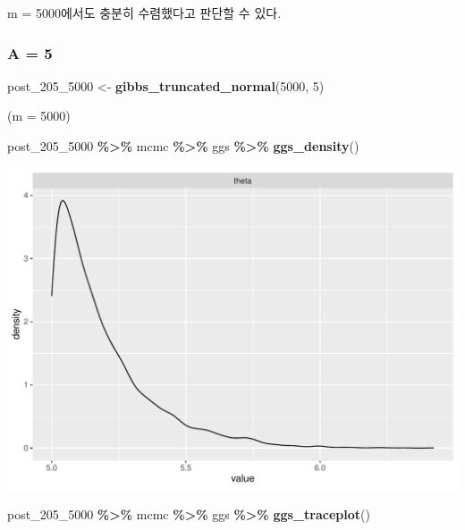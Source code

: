 \documentclass[
]{article}
\newenvironment{Shaded}{\begin{snugshade}}{\end{snugshade}}
\newcommand{\DecValTok}[1]{\textcolor[rgb]{0.00,0.00,0.81}{#1}}
\newcommand{\FunctionTok}[1]{\textcolor[rgb]{0.13,0.29,0.53}{\textbf{#1}}}
\newcommand{\NormalTok}[1]{#1}
\newcommand{\OtherTok}[1]{\textcolor[rgb]{0.56,0.35,0.01}{#1}}
\newcommand{\SpecialCharTok}[1]{\textcolor[rgb]{0.81,0.36,0.00}{\textbf{#1}}}
\begin{document}
m = 5000에서도 충분히 수렴했다고 판단할 수 있다.

\subsubsection{A = 5}\label{a-5}

\begin{Shaded}
\begin{Highlighting}[]
\NormalTok{post\_205\_5000 }\OtherTok{\textless{}{-}} \FunctionTok{gibbs\_truncated\_normal}\NormalTok{(}\DecValTok{5000}\NormalTok{, }\DecValTok{5}\NormalTok{)}
\end{Highlighting}
\end{Shaded}

(m = 5000)

\begin{Shaded}
\begin{Highlighting}[]
\NormalTok{post\_205\_5000 }\SpecialCharTok{\%\textgreater{}\%}\NormalTok{ mcmc }\SpecialCharTok{\%\textgreater{}\%}\NormalTok{ ggs }\SpecialCharTok{\%\textgreater{}\%} \FunctionTok{ggs\_density}\NormalTok{()}
\end{Highlighting}
\end{Shaded}

\begin{center}\includegraphics[width=0.8\linewidth]{Bayes_stat_hw3_files/figure-latex/unnamed-chunk-36-1} \end{center}

\begin{Shaded}
\begin{Highlighting}[]
\NormalTok{post\_205\_5000 }\SpecialCharTok{\%\textgreater{}\%}\NormalTok{ mcmc }\SpecialCharTok{\%\textgreater{}\%}\NormalTok{ ggs }\SpecialCharTok{\%\textgreater{}\%} \FunctionTok{ggs\_traceplot}\NormalTok{()}
\end{Highlighting}
\end{Shaded}
\end{document}
